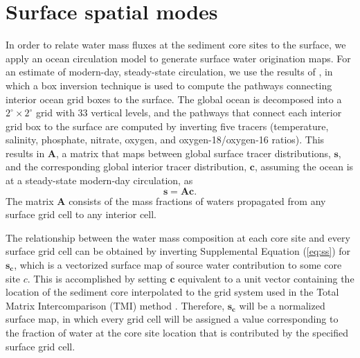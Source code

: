 \documentclass[draft]{agujournal2019}
\begin{document}
\section{Surface spatial modes \label{sec:spatmode}}
In order to relate water mass fluxes at the sediment core sites to the surface, we apply an ocean circulation model to generate surface water origination maps. For an estimate of modern-day, steady-state circulation, we use the results of , in which a box inversion technique is used to compute the pathways connecting interior ocean grid boxes to the surface. The global ocean is decomposed into a $2^{\circ} \times 2^{\circ}$ grid with 33 vertical levels, and the pathways that connect each interior grid box to the surface are computed by inverting five tracers (temperature, salinity, phosphate, nitrate, oxygen, and oxygen-18/oxygen-16 ratios). This results in $\mathbf{A}$, a matrix that maps between global surface tracer distributions, $\mathbf{s}$, and the corresponding global interior tracer distribution, $\mathbf{c}$, assuming the ocean is at a steady-state modern-day circulation, as
\begin{equation}
\label{eq:ss}
\mathbf{s} = \mathbf{Ac}. 
\end{equation}
The matrix $\mathbf{A}$ consists of the mass fractions of waters propagated from any surface grid cell to any interior cell.

The relationship between the water mass composition at each core site and every surface grid cell can be obtained by inverting Supplemental Equation (\ref{eq:ss}) for $\mathbf{s_{c}}$, which is a vectorized surface map of source water contribution to some core site $c$. This is accomplished by setting $\mathbf{c}$ equivalent to a unit vector containing the location of the sediment core interpolated to the grid system used in the Total Matrix Intercomparison (TMI) method \cite{gebbie2010}. Therefore, $\mathbf{s_c}$ will be a normalized surface map, in which every grid cell will be assigned a value corresponding to the fraction of water at the core site location that is contributed by the specified surface grid cell. 
\end{document}
